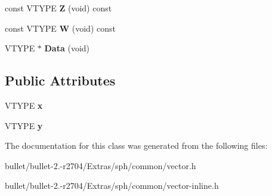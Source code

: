 \begin{DoxyCompactItemize}
\item 
\hypertarget{class_vector2_d_c_a985da775379fac0101a88024ce5cb942}{const V\+T\+Y\+P\+E {\bfseries Z} (void) const }\label{class_vector2_d_c_a985da775379fac0101a88024ce5cb942}

\item 
\hypertarget{class_vector2_d_c_a450f3d5f2ea032fbe4c230533058fbaf}{const V\+T\+Y\+P\+E {\bfseries W} (void) const }\label{class_vector2_d_c_a450f3d5f2ea032fbe4c230533058fbaf}

\item 
\hypertarget{class_vector2_d_c_a198ded9fe7cfe6bd6a010dd472afeba2}{V\+T\+Y\+P\+E $\ast$ {\bfseries Data} (void)}\label{class_vector2_d_c_a198ded9fe7cfe6bd6a010dd472afeba2}

\end{DoxyCompactItemize}
\subsection*{Public Attributes}
\begin{DoxyCompactItemize}
\item 
\hypertarget{class_vector2_d_c_a4b56f4559e86a138eca2eeecb415d0c4}{V\+T\+Y\+P\+E {\bfseries x}}\label{class_vector2_d_c_a4b56f4559e86a138eca2eeecb415d0c4}

\item 
\hypertarget{class_vector2_d_c_a2e39a2b455da39048d06a9e8a5390a24}{V\+T\+Y\+P\+E {\bfseries y}}\label{class_vector2_d_c_a2e39a2b455da39048d06a9e8a5390a24}

\end{DoxyCompactItemize}


The documentation for this class was generated from the following files\+:\begin{DoxyCompactItemize}
\item 
bullet/bullet-\/2.-\/r2704/\+Extras/sph/common/vector.\+h\item 
bullet/bullet-\/2.-\/r2704/\+Extras/sph/common/vector-\/inline.\+h\end{DoxyCompactItemize}
